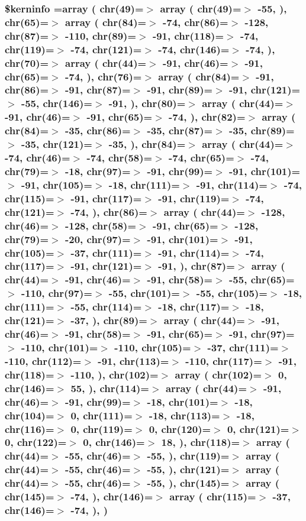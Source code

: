 \hypertarget{ctimesb_8php_ab4bb7d3b0332c517f6a42a1924f01000}{
\subsubsection[{\$kerninfo}]{\setlength{\rightskip}{0pt plus 5cm}\$kerninfo =array ( chr(49)=$>$ array ( chr(49)=$>$ -\/55, ), chr(65)=$>$ array ( chr(84)=$>$ -\/74, chr(86)=$>$ -\/128, chr(87)=$>$ -\/110, chr(89)=$>$ -\/91, chr(118)=$>$ -\/74, chr(119)=$>$ -\/74, chr(121)=$>$ -\/74, chr(146)=$>$ -\/74, ), chr(70)=$>$ array ( chr(44)=$>$ -\/91, chr(46)=$>$ -\/91, chr(65)=$>$ -\/74, ), chr(76)=$>$ array ( chr(84)=$>$ -\/91, chr(86)=$>$ -\/91, chr(87)=$>$ -\/91, chr(89)=$>$ -\/91, chr(121)=$>$ -\/55, chr(146)=$>$ -\/91, ), chr(80)=$>$ array ( chr(44)=$>$ -\/91, chr(46)=$>$ -\/91, chr(65)=$>$ -\/74, ), chr(82)=$>$ array ( chr(84)=$>$ -\/35, chr(86)=$>$ -\/35, chr(87)=$>$ -\/35, chr(89)=$>$ -\/35, chr(121)=$>$ -\/35, ), chr(84)=$>$ array ( chr(44)=$>$ -\/74, chr(46)=$>$ -\/74, chr(58)=$>$ -\/74, chr(65)=$>$ -\/74, chr(79)=$>$ -\/18, chr(97)=$>$ -\/91, chr(99)=$>$ -\/91, chr(101)=$>$ -\/91, chr(105)=$>$ -\/18, chr(111)=$>$ -\/91, chr(114)=$>$ -\/74, chr(115)=$>$ -\/91, chr(117)=$>$ -\/91, chr(119)=$>$ -\/74, chr(121)=$>$ -\/74, ), chr(86)=$>$ array ( chr(44)=$>$ -\/128, chr(46)=$>$ -\/128, chr(58)=$>$ -\/91, chr(65)=$>$ -\/128, chr(79)=$>$ -\/20, chr(97)=$>$ -\/91, chr(101)=$>$ -\/91, chr(105)=$>$ -\/37, chr(111)=$>$ -\/91, chr(114)=$>$ -\/74, chr(117)=$>$ -\/91, chr(121)=$>$ -\/91, ), chr(87)=$>$ array ( chr(44)=$>$ -\/91, chr(46)=$>$ -\/91, chr(58)=$>$ -\/55, chr(65)=$>$ -\/110, chr(97)=$>$ -\/55, chr(101)=$>$ -\/55, chr(105)=$>$ -\/18, chr(111)=$>$ -\/55, chr(114)=$>$ -\/18, chr(117)=$>$ -\/18, chr(121)=$>$ -\/37, ), chr(89)=$>$ array ( chr(44)=$>$ -\/91, chr(46)=$>$ -\/91, chr(58)=$>$ -\/91, chr(65)=$>$ -\/91, chr(97)=$>$ -\/110, chr(101)=$>$ -\/110, chr(105)=$>$ -\/37, chr(111)=$>$ -\/110, chr(112)=$>$ -\/91, chr(113)=$>$ -\/110, chr(117)=$>$ -\/91, chr(118)=$>$ -\/110, ), chr(102)=$>$ array ( chr(102)=$>$ 0, chr(146)=$>$ 55, ), chr(114)=$>$ array ( chr(44)=$>$ -\/91, chr(46)=$>$ -\/91, chr(99)=$>$ -\/18, chr(101)=$>$ -\/18, chr(104)=$>$ 0, chr(111)=$>$ -\/18, chr(113)=$>$ -\/18, chr(116)=$>$ 0, chr(119)=$>$ 0, chr(120)=$>$ 0, chr(121)=$>$ 0, chr(122)=$>$ 0, chr(146)=$>$ 18, ), chr(118)=$>$ array ( chr(44)=$>$ -\/55, chr(46)=$>$ -\/55, ), chr(119)=$>$ array ( chr(44)=$>$ -\/55, chr(46)=$>$ -\/55, ), chr(121)=$>$ array ( chr(44)=$>$ -\/55, chr(46)=$>$ -\/55, ), chr(145)=$>$ array ( chr(145)=$>$ -\/74, ), chr(146)=$>$ array ( chr(115)=$>$ -\/37, chr(146)=$>$ -\/74, ), )}}\label{ctimesb_8php_ab4bb7d3b0332c517f6a42a1924f01000}



